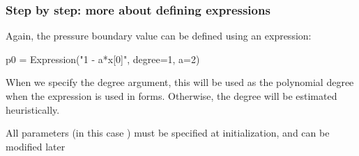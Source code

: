 \begin{frame}[fragile]
  \frametitle{Step by step: more about defining expressions}

  Again, the pressure boundary value can be defined using an
  expression:
  \begin{python}
p0 = Expression("1 - a*x[0]", degree=1, a=2)
  \end{python}

  \bigskip

  When we specify the degree argument, this will be used as the
  polynomial degree when the expression is used in forms. Otherwise,
  the degree will be estimated heuristically.

  \bigskip

  All parameters (in this case ) must be specified at
  initialization, and can be modified later

\end{frame}
